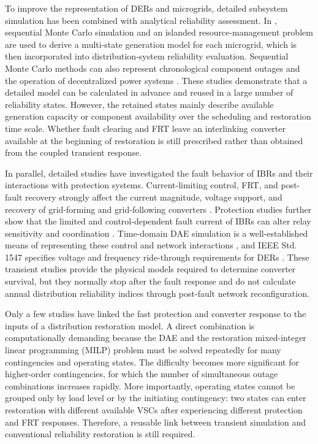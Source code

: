 \documentclass[journal]{IEEEtran}
\begin{document}
To improve the representation of DERs and microgrids, detailed subsystem
simulation has been combined with analytical reliability assessment. In
\cite{omri2024microgrid}, sequential Monte Carlo simulation and an islanded
resource-management problem are used to derive a multi-state generation model
for each microgrid, which is then incorporated into distribution-system
reliability evaluation. Sequential Monte Carlo methods can also represent
chronological component outages and the operation of decentralized power
systems \cite{breve2024flow}. These studies demonstrate that a detailed model
can be calculated in advance and reused in a large number of reliability
states. However, the retained states mainly describe available generation
capacity or component availability over the scheduling and restoration time
scale. Whether fault clearing and FRT leave an interlinking converter available
at the beginning of restoration is still prescribed rather than obtained from
the coupled transient response.

In parallel, detailed studies have investigated the fault behavior of IBRs and
their interactions with protection systems. Current-limiting control, FRT, and
post-fault recovery strongly affect the current magnitude, voltage support, and
recovery of grid-forming and grid-following converters
\cite{li2022adaptivefrt,qoria2023overcurrent,fan2023faultrecovery,
azizi2024gridcode}. Protection studies further show that the limited and
control-dependent fault current of IBRs can alter relay sensitivity and
coordination \cite{cisneros2024protection}. Time-domain DAE simulation is a
well-established means of representing these control and network interactions
\cite{lara2023psd}, and IEEE Std. 1547 specifies voltage and frequency
ride-through requirements for DERs \cite{ieee1547,ieee1547a}. These transient
studies provide the physical models required to determine converter survival,
but they normally stop after the fault response and do not calculate annual
distribution reliability indices through post-fault network reconfiguration.

Only a few studies have linked the fast protection and converter response to
the inputs of a distribution restoration model. A direct combination is
computationally demanding because the DAE and the restoration mixed-integer
linear programming (MILP) problem must be solved repeatedly for many
contingencies and operating states. The difficulty becomes more significant
for higher-order contingencies, for which the number of simultaneous outage
combinations increases rapidly. More importantly, operating states cannot be
grouped only by load level or by the initiating contingency: two states can
enter restoration with different available VSCs after experiencing different
protection and FRT responses. Therefore, a reusable link between transient
simulation and conventional reliability restoration is still required.
\end{document}

